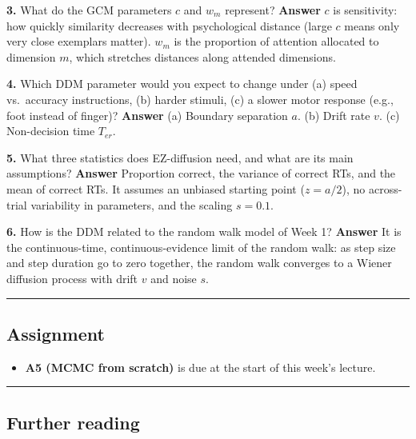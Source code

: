 \textbf{3.} What do the GCM parameters \(c\) and \(w_m\) represent?
\textbf{Answer} \(c\) is sensitivity: how quickly similarity decreases
with psychological distance (large \(c\) means only very close exemplars
matter). \(w_m\) is the proportion of attention allocated to dimension
\(m\), which stretches distances along attended dimensions.

\textbf{4.} Which DDM parameter would you expect to change under (a)
speed vs.~accuracy instructions, (b) harder stimuli, (c) a slower motor
response (e.g., foot instead of finger)? \textbf{Answer} (a) Boundary
separation \(a\). (b) Drift rate \(v\). (c) Non-decision time
\(T_{er}\).

\textbf{5.} What three statistics does EZ-diffusion need, and what are
its main assumptions? \textbf{Answer} Proportion correct, the variance
of correct RTs, and the mean of correct RTs. It assumes an unbiased
starting point (\(z = a/2\)), no across-trial variability in parameters,
and the scaling \(s = 0.1\).

\textbf{6.} How is the DDM related to the random walk model of Week 1?
\textbf{Answer} It is the continuous-time, continuous-evidence limit of
the random walk: as step size and step duration go to zero together, the
random walk converges to a Wiener diffusion process with drift \(v\) and
noise \(s\).

\begin{center}\rule{0.5\linewidth}{0.5pt}\end{center}

\subsection{Assignment}

\begin{itemize}
\tightlist
\item
  \textbf{A5 (MCMC from scratch)} is due at the start of this week's
  lecture.
\end{itemize}

\begin{center}\rule{0.5\linewidth}{0.5pt}\end{center}

\subsection{Further reading}

